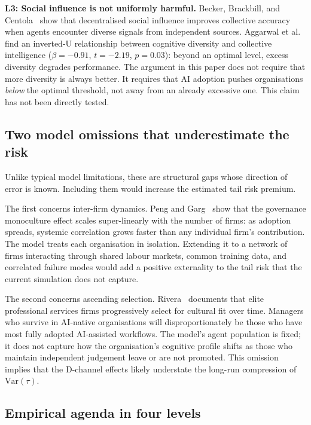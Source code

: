 \documentclass[11pt,a4paper]{article}
\begin{document}
\textbf{L3: Social influence is not uniformly harmful.} Becker, Brackbill,
and Centola~\cite{becker_pnas_2017} show that decentralised social
influence improves collective accuracy when agents encounter diverse signals
from independent sources. Aggarwal et
al.~\cite{aggarwal_frontpsych_2019} find an inverted-U relationship between
cognitive diversity and collective intelligence ($\beta = -0.91$,
$t = -2.19$, $p = 0.03$): beyond an optimal level, excess diversity
degrades performance. The argument in this paper does not require that more
diversity is always better. It requires that AI adoption pushes
organisations \textit{below} the optimal threshold, not away from an already
excessive one. This claim has not been directly tested.

\subsection{Two model omissions that underestimate the risk}

Unlike typical model limitations, these are structural gaps whose direction
of error is known. Including them would increase the estimated tail risk
premium.

The first concerns inter-firm dynamics. Peng and
Garg~\cite{peng_neurips_2024} show that the governance monoculture effect
scales super-linearly with the number of firms: as adoption spreads,
systemic correlation grows faster than any individual firm's contribution.
The model treats each organisation in isolation. Extending it to a network
of firms interacting through shared labour markets, common training data,
and correlated failure modes would add a positive externality to the tail
risk that the current simulation does not capture.

The second concerns ascending selection.
Rivera~\cite{rivera_book_2015} documents that elite professional services
firms progressively select for cultural fit over time. Managers who survive
in AI-native organisations will disproportionately be those who have most
fully adopted AI-assisted workflows. The model's agent population is fixed;
it does not capture how the organisation's cognitive profile shifts as those
who maintain independent judgement leave or are not promoted. This omission
implies that the D-channel effects likely understate the long-run
compression of $\text{Var}(\tau)$.

\subsection{Empirical agenda in four levels}
\end{document}
